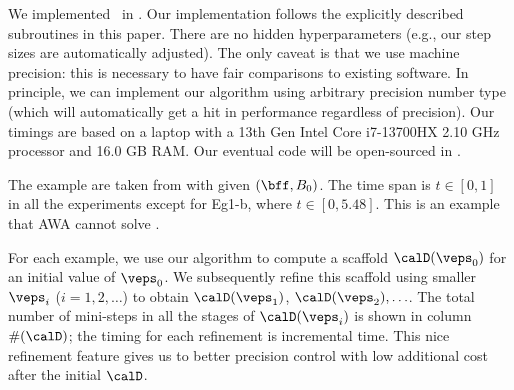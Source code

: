 		We implemented \ourAlgo\ in \Cpp.
	Our implementation follows the explicitly described
	subroutines in this paper.  There are no hidden hyperparameters
	(e.g., our step sizes are automatically adjusted).
	The only caveat is that we use machine precision:
	this is necessary to have fair comparisons to existing software.
	In principle, we can implement
	our algorithm using arbitrary precision number type
	(which will automatically get a hit in performance
	regardless of precision).
	Our timings are based on a laptop with a 
	13th Gen Intel Core i7-13700HX 2.10 GHz processor and 16.0 GB RAM.
	Our eventual code will be open-sourced in \cite{core:home}.
	
	
	The example are taken from  with
	given $(\bff, B_0)$.
	The time span is $t\in [0,1]$ in all the experiments
	except for Eg1-b, where $t\in [0,5.48]$.  This is
	an example that AWA cannot solve \cite[p.~13]{bunger:taylorODE:20}.
	
	
	For each example, we use our algorithm to compute a scaffold
	$\calD(\veps_0)$ for an initial value of $\veps_0$.
	We subsequently
	refine this scaffold using smaller $\veps_i$ ($i=1,2,\ldots$)
	to obtain $\calD(\veps_1)$, $\calD(\veps_2), \ldots$.
	The total number of mini-steps in all the stages of
	$\calD(\veps_i)$ is shown in column
	$\#(\calD)$; the timing for
	each refinement is incremental time.
	This nice refinement feature gives
	us to better precision control with
	low additional cost after the initial $\calD$.  
	
	
	
